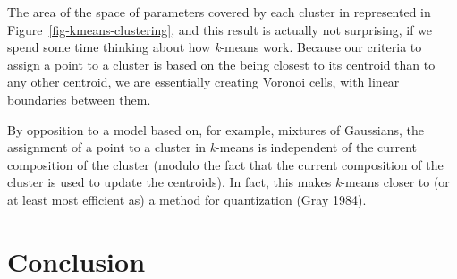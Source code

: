 \documentclass[
  letterpaper,
]{scrbook}
\begin{document}
The area of the space of parameters covered by each cluster in
represented in Figure~\ref{fig-kmeans-clustering}, and this result is
actually not surprising, if we spend some time thinking about how
\emph{k}-means work. Because our criteria to assign a point to a cluster
is based on the being closest to its centroid than to any other
centroid, we are essentially creating Voronoi cells, with linear
boundaries between them.

By opposition to a model based on, for example, mixtures of Gaussians,
the assignment of a point to a cluster in \emph{k}-means is independent
of the current composition of the cluster (modulo the fact that the
current composition of the cluster is used to update the centroids). In
fact, this makes \emph{k}-means closer to (or at least most efficient
as) a method for quantization (Gray 1984).

\begin{figure}[bt]



\end{figure}%

\section{Conclusion}\label{conclusion}
\end{document}
